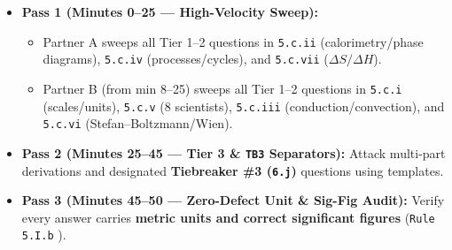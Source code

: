 \begin{twocol}[0.485]
\begin{formulacard}
\begin{itemize}
  \item \textbf{Pass 1 (Minutes 0--25 — High-Velocity Sweep):}
    \begin{itemize}
      \item Partner A sweeps all Tier 1--2 questions in \texttt{5.c.ii} (calorimetry/phase diagrams), \texttt{5.c.iv} (processes/cycles), and \texttt{5.c.vii} ($\Delta S/\Delta H$).
      \item Partner B (from min 8--25) sweeps all Tier 1--2 questions in \texttt{5.c.i} (scales/units), \texttt{5.c.v} (8 scientists), \texttt{5.c.iii} (conduction/convection), and \texttt{5.c.vi} (Stefan--Boltzmann/Wien).
    \end{itemize}
  \item \textbf{Pass 2 (Minutes 25--45 — Tier 3 \& \texttt{TB3} Separators):} Attack multi-part derivations and designated \textbf{Tiebreaker \#3 (\texttt{6.j})} questions using  templates.
  \item \textbf{Pass 3 (Minutes 45--50 — Zero-Defect Unit \& Sig-Fig Audit):} Verify every answer carries \textbf{metric units and correct significant figures} (\texttt{Rule 5.I.b} ).
\end{itemize}
\end{formulacard}
\end{twocol}

